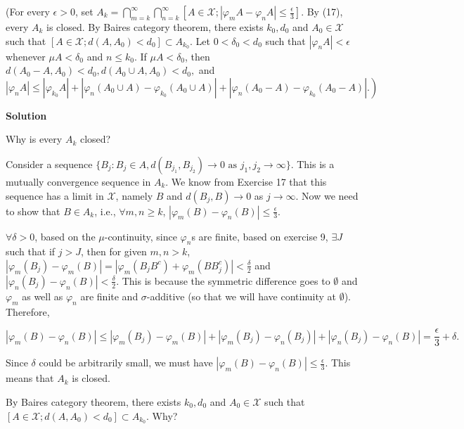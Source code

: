 \documentclass[
]{article}
\begin{document}
(For every \(\epsilon>0\), set
\(A_k=\bigcap_{m=k}^{\infty} \bigcap_{n=k}^{\infty}\left[A \in \mathcal X ;\left|\varphi_m A-\varphi_n A\right|\right.\left.\le \frac{\epsilon}{3}\right]\).
By (17), every \(A_k\) is closed. By Baire\textquotesingle s category
theorem, there exists \(k_0, d_0\) and \(A_0 \in \mathcal X\) such that
\(\left[A \in \mathcal X ; d\left(A, A_0\right)<d_0\right] \subset A_{k_0}\).
Let \(0<\delta_0<d_0\) such that \(\left|\varphi_n A\right|<\epsilon\)
whenever \(\mu A<\delta_0\) and \(n \le k_0\). If \(\mu A<\delta_0\),
then
\(d\left(A_0-A, A_0\right)<d_0,  d\left(A_0 \cup A, A_0\right)<d_0,\)
and
\(\left|\varphi_n A\right| \le\left|\varphi_{k_0} A\right|+\left.\left|\varphi_n\left(A_0 \cup A\right)-\varphi_{k_0}\left(A_0 \cup A\right)\right|+\left|\varphi_n\left(A_0-A\right)-\varphi_{k_0}\left(A_0-A\right)\right|.\right)\)

\textbf{Solution}

Why is every \(A_k\) closed?

Consider a sequence
\(\{B_{j}: B_j\in A, d(B_{j_1}, B_{j_2}) \to 0 \text{ as } j_1, j_2 \to \infty\}\).
This is a mutually convergence sequence in \(A_k\). We know from
Exercise 17 that this sequence has a limit in \(\mathcal X\), namely
\(B\) and \(d(B_j, B) \to 0\) as \(j \to \infty\). Now we need to show
that \(B\in A_k\), i.e., \(\forall m, n \ge k\),
\(|\varphi_m(B) - \varphi_n(B)| \le \frac{\epsilon}{3}\).

\(\forall \delta > 0\), based on the \(\mu\)-continuity, since
\(\varphi_n\)\textquotesingle s are finite, based on exercise 9,
\(\exists J\) such that if \(j > J\), then for given \(m, n > k\),
\(|\varphi_m(B_j) - \varphi_m(B)|= |\varphi_m(B_jB^c) + \varphi_m(BB_j^c)| < \frac{\delta}{2}\)
and \(|\varphi_n(B_j) - \varphi_n(B)|  < \frac{\delta}{2}\). This is
because the symmetric difference goes to \(\emptyset\) and \(\varphi_m\)
as well as \(\varphi_n\) are finite and \(\sigma\)-additive (so that we
will have continuity at \(\emptyset\)). Therefore,

\[|\varphi_m(B) - \varphi_n(B)| \le |\varphi_m(B_j) - \varphi_m(B)| + |\varphi_m(B_j) - \varphi_n(B_j)| + |\varphi_n(B_j) - \varphi_n(B)| = \frac{\epsilon}{3} + \delta.\]

Since \(\delta\) could be arbitrarily small, we must have
\(|\varphi_m(B) - \varphi_n(B)| \le \frac{\epsilon}{3}\). This means
that \(A_k\) is closed.

By Baire\textquotesingle s category theorem, there exists \(k_0, d_0\)
and \(A_0 \in \mathcal X\) such that
\(\left[A \in \mathcal X ; d\left(A, A_0\right)<d_0\right] \subset A_{k_0}\).
Why?
\end{document}

